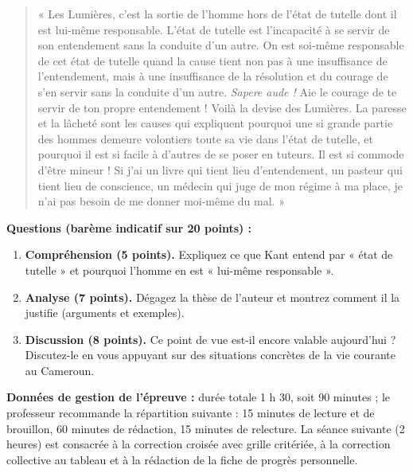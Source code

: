 \documentclass[11pt]{article}
\newcounter{popsec}
\newcounter{popsub}
\newcommand{\courssub}[1]{%
  \stepcounter{popsub}%
  \par\vspace{9pt}\noindent{\popxbold\fontsize{11.5}{13}\selectfont\color{popink}{\color{poporange}\thepopsec.\thepopsub}\hspace{6pt}#1}\par\nopagebreak\vspace{4pt}
}
\begin{document}
\begin{quote}
« Les Lumières, c'est la sortie de l'homme hors de l'état de tutelle dont il est lui-même responsable. L'état de tutelle est l'incapacité à se servir de son entendement sans la conduite d'un autre. On est soi-même responsable de cet état de tutelle quand la cause tient non pas à une insuffisance de l'entendement, mais à une insuffisance de la résolution et du courage de s'en servir sans la conduite d'un autre. \emph{Sapere aude !} Aie le courage de te servir de ton propre entendement ! Voilà la devise des Lumières. La paresse et la lâcheté sont les causes qui expliquent pourquoi une si grande partie des hommes demeure volontiers toute sa vie dans l'état de tutelle, et pourquoi il est si facile à d'autres de se poser en tuteurs. Il est si commode d'être mineur ! Si j'ai un livre qui tient lieu d'entendement, un pasteur qui tient lieu de conscience, un médecin qui juge de mon régime à ma place, je n'ai pas besoin de me donner moi-même du mal. »
\end{quote}

\textbf{Questions (barème indicatif sur 20 points) :}
\begin{enumerate}
\item \textbf{Compréhension (5 points).} Expliquez ce que Kant entend par « état de tutelle » et pourquoi l'homme en est « lui-même responsable ».
\item \textbf{Analyse (7 points).} Dégagez la thèse de l'auteur et montrez comment il la justifie (arguments et exemples).
\item \textbf{Discussion (8 points).} Ce point de vue est-il encore valable aujourd'hui ? Discutez-le en vous appuyant sur des situations concrètes de la vie courante au Cameroun.
\end{enumerate}

\textbf{Données de gestion de l'épreuve :} durée totale 1 h 30, soit 90 minutes ; le professeur recommande la répartition suivante : 15 minutes de lecture et de brouillon, 60 minutes de rédaction, 15 minutes de relecture. La séance suivante (2 heures) est consacrée à la correction croisée avec grille critériée, à la correction collective au tableau et à la rédaction de la fiche de progrès personnelle.

\courssub{Consignes}
\end{document}
